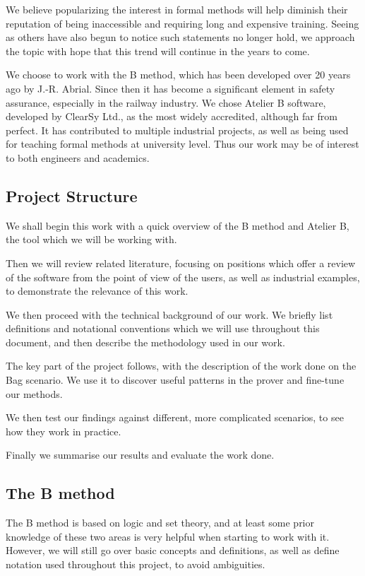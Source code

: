 \documentclass[12pt,journal,duplex]{IEEEtran}
\begin{document}
	We believe popularizing the interest in formal methods will help diminish their reputation of being inaccessible and requiring long and expensive training. Seeing as others have also begun to notice such statements no longer hold\cite{amazon}, we approach the topic with hope that this trend will continue in the years to come.

	We choose to work with the B method, which has been developed over 20 years ago by J.-R. Abrial. Since then it has become a significant element in safety assurance, especially in the railway industry. We chose Atelier B software, developed by ClearSy Ltd., as the most widely accredited, although far from perfect. It has contributed to multiple industrial projects, as well as being used for teaching formal methods at university level. Thus our work may be of interest to both engineers and academics.

	\subsection{Project Structure}
	We shall begin this work with a quick overview of the B method and Atelier B, the tool which we will be working with.

	Then we will review related literature, focusing on positions which offer a review of the software from the point of view of the users, as well as industrial examples, to demonstrate the relevance of this work.

	We then proceed with the technical background of our work. We briefly list definitions and notational conventions which we will use throughout this document, and then describe the methodology used in our work.

	The key part of the project follows, with the description of the work done on the Bag scenario. We use it to discover useful patterns in the prover and fine-tune our methods.

	We then test our findings against different, more complicated scenarios, to see how they work in practice.

	Finally we summarise our results and evaluate the work done.

	\subsection{The B method}
	The B method is based on logic and set theory, and at least some prior knowledge of these two areas is very helpful when starting to work with it. However, we will still go over basic concepts and definitions, as well as define notation used throughout this project, to avoid ambiguities.
\end{document}
